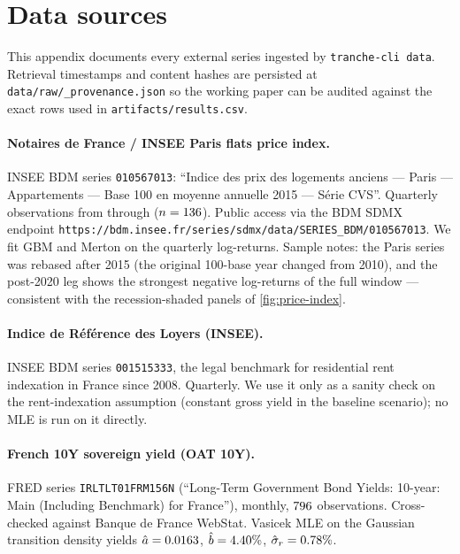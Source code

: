 \clearpage
\appendix
\section{Data sources}\label{app:data}

This appendix documents every external series ingested by
\texttt{tranche-cli data}. Retrieval timestamps and content hashes are
persisted at \texttt{data/raw/\_provenance.json} so the working paper can
be audited against the exact rows used in
\texttt{artifacts/results.csv}.

\paragraph{Notaires de France / INSEE Paris flats price index.}
INSEE BDM series \texttt{010567013}: ``Indice des prix des logements
anciens — Paris — Appartements — Base 100 en moyenne annuelle 2015 — Série
CVS''. Quarterly observations from \dataParisStart{} through
\dataParisEnd{} ($n = 136{}$). Public access via the BDM SDMX
endpoint \texttt{https://bdm.insee.fr/series/sdmx/data/SERIES\_BDM/010567013}.
We fit GBM and Merton on the quarterly log-returns. Sample notes: the
Paris series was rebased after 2015 (the original 100-base year changed
from 2010), and the post-2020 leg shows the strongest negative
log-returns of the full window — consistent with the recession-shaded
panels of \cref{fig:price-index}.

\paragraph{Indice de Référence des Loyers (INSEE).}
INSEE BDM series \texttt{001515333}, the legal benchmark for residential
rent indexation in France since 2008. Quarterly. We use it only as a
sanity check on the rent-indexation assumption (constant gross yield in
the baseline scenario); no MLE is run on it directly.

\paragraph{French 10Y sovereign yield (OAT 10Y).}
FRED series \texttt{IRLTLT01FRM156N} (``Long-Term Government Bond Yields:
10-year: Main (Including Benchmark) for France''), monthly,
$796{}$ observations. Cross-checked against Banque de France
WebStat. Vasicek MLE on the Gaussian transition density yields
$\hat a = 0.0163{}$, $\hat b = 4.40\%{}$,
$\hat\sigma_r = 0.78\%{}$.

